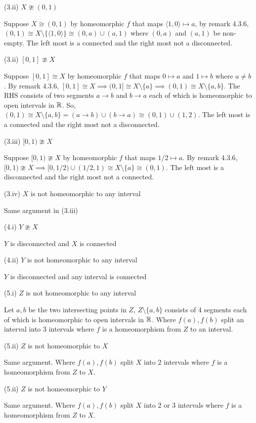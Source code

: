 \documentclass{article}
\begin{document}
(3.ii) $X \ncong (0, 1)$

Suppose $X \cong (0, 1)$ by homeomorphic $f$ that maps $\langle 1, 0\rangle \mapsto a$, by remark 4.3.6, $(0, 1) \cong X \setminus \{\langle 1, 0\rangle\} \cong (0, a)\cup (a, 1)$ where $(0, a)$ and $(a, 1)$ be non-empty. The left most is a connected and the right most not a disconnected.

(3.ii) $[0, 1] \ncong X$

Suppose $[0, 1] \cong X$ by homeomorphic $f$ that maps $0 \mapsto a$ and $1 \mapsto b$ where $a \neq b$. By remark 4.3.6, $[0, 1] \cong X \implies (0, 1] \cong X \setminus \{a\} \implies (0, 1) \cong X \setminus \{a, b \}$. The RHS consists of two segments $a \to b$ and $b \to a$ each of which is homeomorphic to open intervals in $\mathbb{R}$. So, $(0, 1) \cong X \setminus \{ a, b \} = (a \to b) \cup (b \to a) \cong (0, 1) \cup (1, 2)$. The left most is a connected and the right most not a disconnected.

(3.iii) $[0, 1) \ncong X$

Suppose $[0, 1) \ncong X$ by homeomorphic $f$ that maps $1/2 \mapsto a$. By remark 4.3.6, $[0, 1) \ncong X \implies [0, 1/2) \cup (1/2, 1) \cong X \setminus \{ a \} \cong (0, 1)$. The left most is a disconnected and the right most not a connected.

(3.iv) $X$ is not homeomorphic to any interval

Same argument in (3.iii)

(4.i) $Y \ncong X$

$Y$ is disconnected and $X$ is connected

(4.ii) $Y$ is not homeomorphic to any interval

$Y$ is disconnected and any interval is connected

(5.i) $Z$ is not homeomorphic to any interval

Let $a, b$ be the two intersecting points in $Z$, $Z \setminus \{ a, b \}$ consists of 4 segments each of which is homeomorphic to open intervals in $\mathbb{R}$. Where $f(a), f(b)$ split an interval into 3 intervals where $f$ is a homeomorphism from $Z$ to an interval.

(5.ii) $Z$ is not homeomorphic to $X$

Same argument. Where $f(a), f(b)$ split $X$ into 2 intervals where $f$ is a homeomorphism from $Z$ to $X$.

(5.ii) $Z$ is not homeomorphic to $Y$

Same argument. Where $f(a), f(b)$ split $X$ into 2 or 3 intervals where $f$ is a homeomorphism from $Z$ to $X$.
\end{document}
